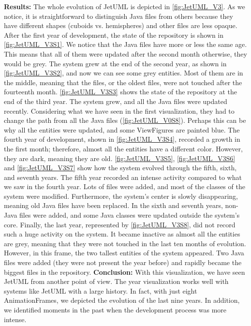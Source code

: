 \bigbreak
\noindent
\textbf{Results:}
The whole evolution of JetUML is depicted in \autoref{fig:JetUML_V3}. As we notice, it is straightforward to distinguish Java files from others because they have different shapes (cuboids vs. hemispheres)  and other files are less opaque. After the first year of development, the state of the repository is shown in \autoref{fig:JetUML_V3S1}. We notice that the Java files have more or less the same age. This means that all of them were updated after the second month otherwise, they would be grey. The system grew at the end of the second year, as shown in \autoref{fig:JetUML_V3S2}, and now we can see some grey entities. Most of them are in the middle, meaning that the  files, or the oldest files, were not touched after the fourteenth month.  \autoref{fig:JetUML_V3S3} shows the state of the repository at the end of the third year. The system grew, and all the Java files were updated recently. Considering what we have seen in the first visualization, they had to change the path from all the Java files (\autoref{fig:JetUML_V0S8}). Perhaps this can be why all the entities were updated, and some ViewFigures are painted blue. 
The fourth year of development, shown in  \autoref{fig:JetUML_V3S4}, recorded a growth in the first month; therefore, almost all the entities have a different color.
However, they are dark, meaning they are old. 
\autoref{fig:JetUML_V3S5},  \autoref{fig:JetUML_V3S6} and  \autoref{fig:JetUML_V3S7} show how the system evolved through the fifth, sixth, and seventh years. The fifth year recorded an intense activity compared to what we saw in the fourth year. Lots of files were added, and most of the classes of the system were modified. Furthermore, the system's center is slowly disappearing, meaning old Java files have been replaced. In the sixth and seventh years, non-Java files were added, and some Java classes were updated outside the system's core. Finally, the last year, represented by \autoref{fig:JetUML_V3S8}, did not record such a huge activity on the system. It became inactive as almost all the entities are grey, meaning that they were not touched in the last ten months of evolution. However, in this frame, the two tallest entities of the system appeared. Two Java files were added (they were not present the year before) and rapidly became the biggest files in the repository.  
\bigbreak
\noindent
\textbf{Conclusion:}
With this visualization, we have seen JetUML from another point of view. The year visualization works well with systems like JetUML with a large history. In fact, with just eight AnimationFrames, we depicted the evolution of the last nine years. In addition, we identified moments in the past when the development process was more intense. 
\bigbreak

